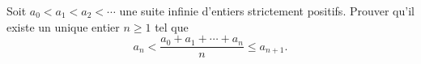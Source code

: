 Soit $a_0 < a_1 < a_2 < \cdots$ une suite infinie d'entiers strictement positifs. Prouver qu'il existe un
unique entier $n \geq 1$ tel que
\[
a_n < \frac{a_0 + a_1 + \cdots + a_n}{n} \leq a_{n+1}.
\]
